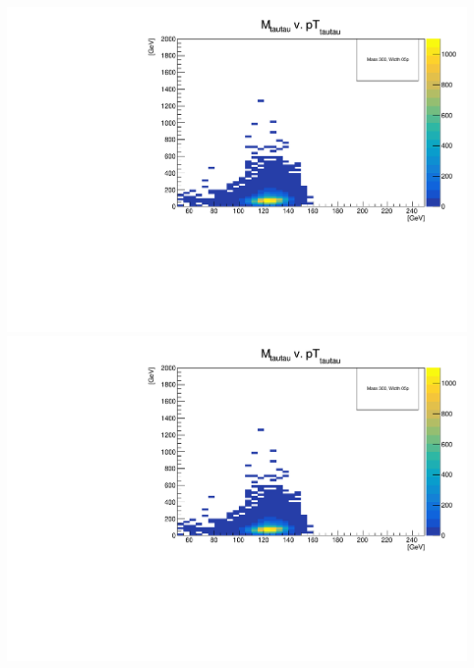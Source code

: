 \documentclass[a4wide,10pt]{article}
\begin{document}
\includegraphics[scale=0.50,page=40]{../Pdfs/Smeared:ditau_Mass_Versus_ditau_TransverseMomentum_VaryingWidths.pdf}
\includegraphics[scale=0.50,page=41]{../Pdfs/Smeared:ditau_Mass_Versus_ditau_TransverseMomentum_VaryingWidths.pdf}
\end{document}
